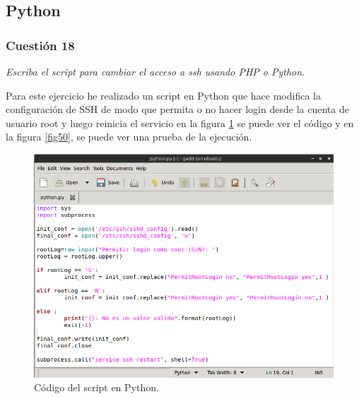 \subsection{Python}
\subsubsection{Cuestión 18}
\textit{Escriba el script para cambiar el acceso a ssh usando PHP o Python.}
\newline

Para este ejercicio he realizado un script en Python que hace modifica la configuración de SSH de modo que permita o no hacer login desde la cuenta de usuario root y luego reinicia el servicio \cite{subp} en la figura \ref{fig49} se puede ver el código y en la figura \ref{fig50}, se puede ver una prueba de la ejecución. 

\begin{figure}[H]
    \begin{center}
    \advance\leftskip-1cm
        \includegraphics[scale=0.5]{imagenes/img54}
        \caption{Código del script en Python.}
        \label{fig49}
    \end{center}
\end{figure}

